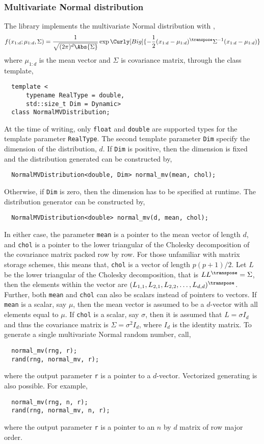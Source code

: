 \subsubsection{Multivariate Normal distribution}

The library implements the multivariate Normal distribution with \pdf,
\begin{equation*}
  f(x_{1:d};\mu_{1:d},\Sigma) = \frac{1}{\sqrt{(2\pi)^d\Abs{\Sigma}}}
  \exp\Curly[Big]{-\frac{1}{2}
    (x_{1:d} - \mu_{1:d})^{\transpose}\Sigma^{-1}(x_{1:d} - \mu_{1:d})}
\end{equation*}
where $\mu_{1:d}$ is the mean vector and $\Sigma$ is covariance matrix, through
the class template,
\begin{Verbatim}
  template <
      typename RealType = double,
      std::size_t Dim = Dynamic>
  class NormalMVDistribution;
\end{Verbatim}
At the time of writing, only \verb|float| and \verb|double| are supported types
for the template parameter \verb|RealType|. The second template parameter
\verb|Dim| specify the dimension of the distribution, $d$. If \verb|Dim| is
positive, then the dimension is fixed and the distribution generated can be
constructed by,
\begin{Verbatim}
  NormalMVDistribution<double, Dim> normal_mv(mean, chol);
\end{Verbatim}
Otherwise, if \verb|Dim| is zero, then the dimension has to be specified at
runtime. The distribution generator can be constructed by,
\begin{Verbatim}
  NormalMVDistribution<double> normal_mv(d, mean, chol);
\end{Verbatim}
In either case, the parameter \verb|mean| is a pointer to the mean vector of
length $d$, and \verb|chol| is a pointer to the lower triangular of the
Cholesky decomposition of the covariance matrix packed row by row. For those
unfamiliar with matrix storage schemes, this means that, \verb|chol| is a
vector of length $p(p+1)/2$. Let $L$ be the lower triangular of the Cholesky
decomposition, that is $LL^{\transpose} = \Sigma$, then the elements within the
vector are $(L_{1,1},L_{2,1},L_{2,2},\dots,L_{d,d})^{\transpose}$. Further,
both \verb|mean| and \verb|chol| can also be scalars instead of pointers to
vectors. If \verb|mean| is a scalar, say $\mu$, then the mean vector is assumed
to be a $d$-vector with all elements equal to $\mu$. If \verb|chol| is a
scalar, say $\sigma$, then it is assumed that $L = \sigma I_d$ and thus the
covariance matrix is $\Sigma = \sigma^2 I_d$, where $I_d$ is the identity
matrix. To generate a single multivariate Normal random number, call,
\begin{Verbatim}
  normal_mv(rng, r);
  rand(rng, normal_mv, r);
\end{Verbatim}
where the output parameter \verb|r| is a pointer to a $d$-vector. Vectorized
generating is also possible. For example,
\begin{Verbatim}
  normal_mv(rng, n, r);
  rand(rng, normal_mv, n, r);
\end{Verbatim}
where the output parameter \verb|r| is a pointer to an $n$ by $d$ matrix of row
major order.
